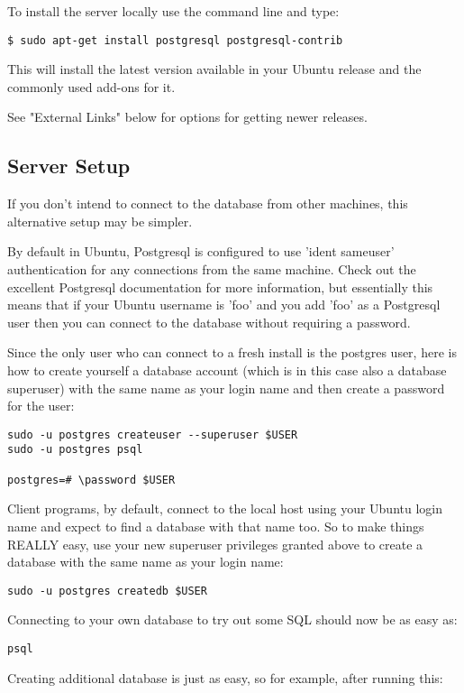 \documentclass[11pt]{article}
\begin{document}
To install the server locally use the command line and type:

\begin{verbatim}
$ sudo apt-get install postgresql postgresql-contrib
\end{verbatim}

This will install the latest version available in your Ubuntu release and the commonly used add-ons for it.

See "External Links" below for options for getting newer releases.

\subsection{Server Setup}
\label{sec:org3838d04}

If you don't intend to connect to the database from other machines, this alternative setup may be simpler.

By default in Ubuntu, Postgresql is configured to use 'ident sameuser' authentication for any connections from the same machine. Check out the excellent Postgresql documentation for more information, but essentially this means that if your Ubuntu username is 'foo' and you add 'foo' as a Postgresql user then you can connect to the database without requiring a password.

Since the only user who can connect to a fresh install is the postgres user, here is how to create yourself a database account (which is in this case also a database superuser) with the same name as your login name and then create a password for the user:

\begin{verbatim}
sudo -u postgres createuser --superuser $USER
sudo -u postgres psql

postgres=# \password $USER
\end{verbatim}

Client programs, by default, connect to the local host using your Ubuntu login name and expect to find a database with that name too. So to make things REALLY easy, use your new superuser privileges granted above to create a database with the same name as your login name:

\begin{verbatim}
sudo -u postgres createdb $USER
\end{verbatim}

Connecting to your own database to try out some SQL should now be as easy as:

\begin{verbatim}
psql
\end{verbatim}
Creating additional database is just as easy, so for example, after running this:
\end{document}
